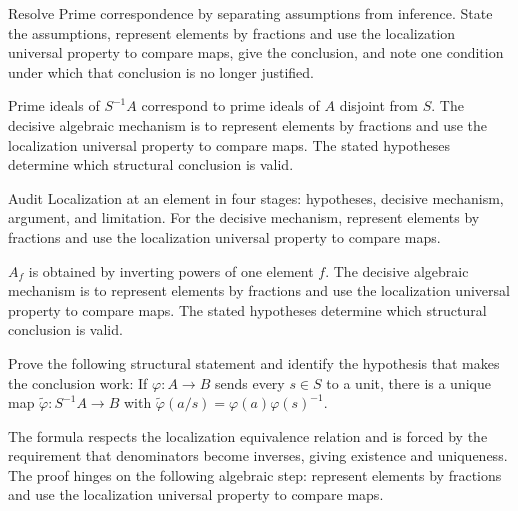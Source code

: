 \begin{problem}\label{prob:v06-problem-07}
Resolve Prime correspondence by separating assumptions from inference. State the assumptions, represent elements by fractions and use the localization universal property to compare maps, give the conclusion, and note one condition under which that conclusion is no longer justified.
\end{problem}
\begin{solution}
Prime ideals of $S^{-1}A$ correspond to prime ideals of $A$ disjoint from $S$. The decisive algebraic mechanism is to represent elements by fractions and use the localization universal property to compare maps. The stated hypotheses determine which structural conclusion is valid.
\end{solution}

\begin{problem}\label{prob:v06-problem-08}
Audit Localization at an element in four stages: hypotheses, decisive mechanism, argument, and limitation. For the decisive mechanism, represent elements by fractions and use the localization universal property to compare maps.
\end{problem}
\begin{solution}
$A_f$ is obtained by inverting powers of one element $f$. The decisive algebraic mechanism is to represent elements by fractions and use the localization universal property to compare maps. The stated hypotheses determine which structural conclusion is valid.
\end{solution}

\begin{problem}\label{prob:v06-problem-09}
Prove the following structural statement and identify the hypothesis that makes the conclusion work: If $\varphi:A\to B$ sends every $s\in S$ to a unit, there is a unique map $\widetilde\varphi:S^{-1}A\to B$ with $\widetilde\varphi(a/s)=\varphi(a)\varphi(s)^{-1}$.
\end{problem}
\begin{solution}
The formula respects the localization equivalence relation and is forced by the requirement that denominators become inverses, giving existence and uniqueness. The proof hinges on the following algebraic step: represent elements by fractions and use the localization universal property to compare maps.
\end{solution}

